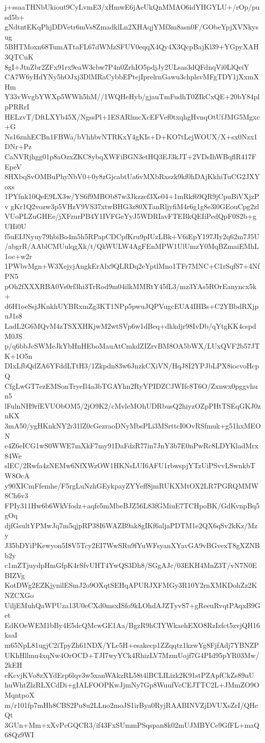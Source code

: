 j+ssaaTHNbUkiout9CyLvmE3/xHmwE6jAeUkQnMMAO6idYHGYLU+/rOp/pusd5b+
gNdtntEKqPhjDDVetr6mVs8ZmadklLn2XHAqjYMf3m8asn0F/GObeYpjXVNkysug
5BHTMoxn68TumATtaFL67dWMzSFUV0eqqX4Qy4X3QcpBajKl39+YGpyXAH3QTCuK
8gI+JtnZbr2ZFx91rx9eaW3cbw7P4n0ZrhIO5pdjJy2ULsas3dQFdnqVi0LlQeiY
CA7W6yHdYNy5hOJxj3DlMRaCybbEPtejIprelrnGawu3chplsvMFgTDY1jXxmXHm
Y33vWvgbYWXp5WWh5hM//1WQHeHyb/gjauTmFudhT0ZIkCxQE+20bY84plpPRRrI
HELzvT/DftLXYb45X/NgssPl+1ESARlmcXcEFVef0txqhgHvnqOtUfJMG5Mgxc+G
Ns16znhECBn1FBWa/bVhhbvNTRKxY4gKIs+D+KO7tLejWOUX/X+sx0Nzx1DNr+Pz
CaNVRjhgg01p8aOzxZKC8ybqXWFiBGN3etHQ3EJ3kJT+2VDsIhWBqflR417FEpeV
8HXbqSvOMBuPhyNbV0+0y8zGjcabtUa6vMXbRxszk9kf0hDAjKkhiTuCG2JXYoxs
1PYfnk10QeE9LX3w/YS6f9MBOb87w3Jkzzef3Xe04+1mRkf69QR9jCpuBiVXjzPv
gKr1Q2vozw3p5VHzV9VS37xtwBHG3z80XTanRljyfiM4r6g1g8e3l0GEouCpg2zl
VUoPLZuGHEe/jXFzurPB4Y1IVFGeYyJ5WDRIavFTEBkQEIiPedQpF0S2b+gUHi0U
f5uEIJNyuy79hbiBo4m5h5RPapCDCpfKru9pIUzLBk+V6iEpY197JIy2q62m7J5U
/abgrR/AAblCMUulqgXk/t/QkWULW4AgFEnMPW1UlUmzY0MqBZmaiEMhL1oc+w2r
1PWbvMgn+W3XejyjAngkErAlx9QLRDq2eYptlMno1TFr7MNC+C1rSqfS7+4NfPN5
pOh2fXXXRBA0Vs0rf3hi3TrRod9m04ilkMMRtY45fL3/mz3YAs5ROrEanyncx5k+
d6H1oeSsjJKukhUYBRxmZg3KT1NPp5pwuJQPVugcEUA4IHBs+C2YBbdRXjpuJ1s8
LadL2G6MQvM4zTSXXHKjwM2wtSVp6w1dBeq+dkkdjr98IvDb/qYtgKK4cspdM0JS
p/q6bbJcSWMeJkYbHnHEboMauAtCmkdZIZrvBM8OA5bWX/LUxQVF2b57JTK+1O5n
DIxLfbQdZA6YFddLTtH3/1Zkpdn83w6JnzkCXiVN/HqJ8I2YPJbLPX8iocvoHcpQ
CfgLwGT7ezEMSonTryeIl4a3bTGAYhn2RyYPIDZCJWIfc8T6O/Zxnwx0pggvhun5
lFulnNH9rfEVUObOM5/2jO9K2/cMvleMOhUDRbusQ2hiyzOZpPHtTSEqGKJ0znKX
3mA50/ygHKnkNY2r31lZ0cGezraoDNyMbsPLi3MSrttcI0OvRSfmuk+g51hxMEON
e4Z6eICG1wS0WWE7mXkF7my91DaFdzR77in7JnY3b7E0nPwRc8LDYKladMrx84We
slEC/2Rwfa4zNEMw6NfXWzOW1HKNsLUI6AFU1rbwspjYTzUiPSvvLSwnkbTW8OcA
y90XICmFfemhe/F5rgLuNzhGEykpayZYYeff8jmRUKXMtOX2LR7PGRQMMW8Ch6v3
FPIy311Hw6b6WkVfodz+aqfe5mMbeBJZ56L83fGMiuE7TCHpoBK/GdKvnpBq5gOq
djfGsultYPMwJq7m5qjpRP38I6WAZB9ak8gIKf6aljaPDTM1e2QX6qSv2kKz/Mzy
J35bDYiPKewyon5I8V5Tcy2EI7WwSRu9fYuWFsyanXYavGA9vBGvexT8gXZNBb2y
c1mZTjuydpHmGfpK4rSfvUHT4YwQS3Dh8/SGgAJc/03EKH4MnZ3T/vN7N0EBIZVg
KotDWg2EZKjynilESmJ2o9OXqtSEHqAPURJXFMGy3R10Y2rnXMKDohZz2KNZCXGo
UiljEMuhQaWPUza13U0eCXd0msxISfo9kLOhdAJZTyvS7+gReeuRvqtPAqxB9Get
EdKOeWEM1bBy4E5dcQMcwGE1Aa/BgzR9hCIYWkaehEXO8RzIzfct5zvjQH16ksaI
m65NpL81ugjC2iTpyZh61NDX/YLc5H+esakecp1ZZqqtz1kzwYg8FjfAdj7YBNZP
UKhHllmu4xqNw4OrOCD+TJI7wyYCk4RhizLV7MzmUojf7G4PId95pYR03Mw/2kEH
eKcvjKVo8zXYdErp6lqv3w5xanWAkzRL58t4lBCLILizk2K91stPZApfCkZs89uU
huWhtZlzRLXCdDi+gIALFOOPKwJjmNy7Gp8WuufVcCEJTTC2L+JMmZO9OMqntpoX
m/r101fp7mHh8CBS2Pu8u2LLno2moJS1irBya0RyjRAABINVZjDVUXsZrI/QHeQt
3GUn+Mm+xXvPcGQCR3/if43FxSUmmPSqspan8k02mUJMBYCe9GfFL+maQ68Qz9WI
